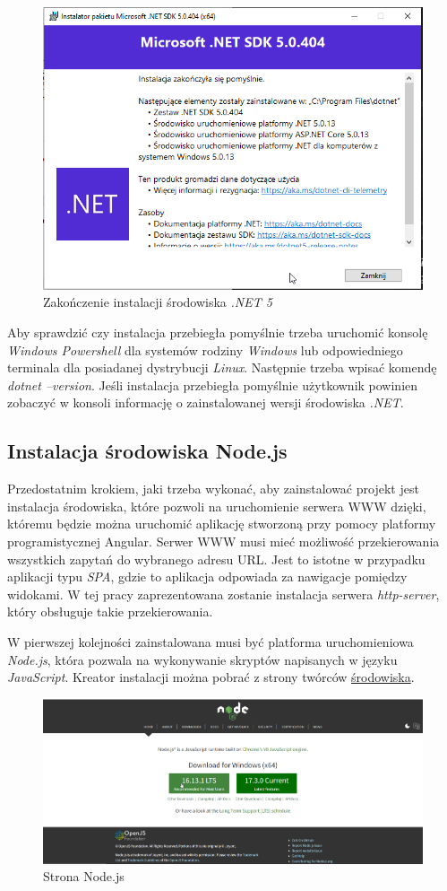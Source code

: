 \documentclass[a4paper,twoside,12pt]{book}
\begin{document}
\begin{figure}[H]
	\centering
	\includegraphics[width=0.5\linewidth]{../zrzuty_ekranu/instalacja_dotnet5/dotnet_finish}
	\caption{Zakończenie instalacji środowiska \textit{.NET 5}}
	\label{fig:dotnetfinish}
\end{figure}

Aby sprawdzić czy instalacja przebiegła pomyślnie trzeba uruchomić konsolę \textit{Windows Powershell} dla systemów rodziny \textit{Windows} lub odpowiedniego terminala dla posiadanej dystrybucji \textit{Linux}. Następnie trzeba wpisać komendę \textit{dotnet --version}. Jeśli instalacja przebiegła pomyślnie użytkownik powinien zobaczyć w konsoli informację o zainstalowanej wersji środowiska \textit{.NET}.

\subsection{Instalacja środowiska Node.js}
Przedostatnim krokiem, jaki trzeba wykonać, aby zainstalować projekt jest instalacja środowiska, które pozwoli na uruchomienie serwera WWW dzięki, któremu będzie można uruchomić aplikację stworzoną przy pomocy platformy programistycznej Angular. Serwer WWW musi mieć możliwość przekierowania wszystkich zapytań do wybranego adresu URL. Jest to istotne w przypadku aplikacji typu \textit{SPA}, gdzie to aplikacja odpowiada za nawigacje pomiędzy widokami. W tej pracy zaprezentowana zostanie instalacja serwera \textit{http-server}, który obsługuje takie przekierowania.

W pierwszej kolejności zainstalowana musi być platforma uruchomieniowa \textit{Node.js}, która pozwala na wykonywanie skryptów napisanych w języku \textit{JavaScript}. Kreator instalacji można pobrać z strony twórców \href{https://nodejs.org/en/}{środowiska}.
\begin{figure}[H]
	\centering
	\includegraphics[width=0.5\linewidth]{../zrzuty_ekranu/instalacja_nodejs/node_page}
	\caption{Strona Node.js}
	\label{fig:nodepage}
\end{figure}
\end{document}
